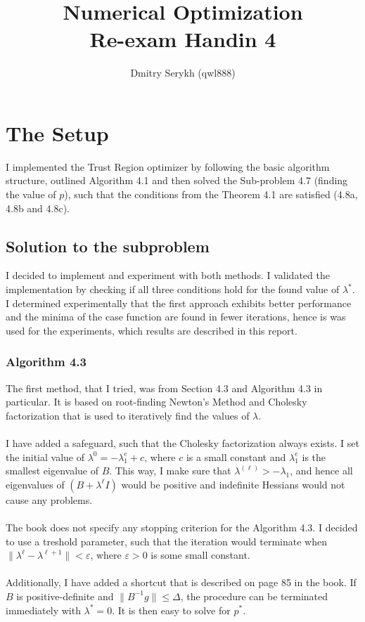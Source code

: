 \documentclass[a4paper]{article}
\title{\vspace{-5cm} Numerical Optimization \\ Re-exam Handin 4}
\author{Dmitry Serykh (qwl888)}
\begin{document}
\maketitle
\section{The Setup}
I implemented the Trust Region optimizer by following the basic algorithm
structure, outlined Algorithm 4.1 and then solved the Sub-problem 4.7 (finding
the value of $p$), such that the conditions from the Theorem 4.1 are satisfied
(4.8a, 4.8b and 4.8c).

\subsection{Solution to the subproblem}
I decided to implement and experiment with both methods. I
validated the implementation by checking if all three conditions hold for the
found value of $\lambda^*$.
I determined experimentally that the first approach exhibits better performance
and the minima of the case function are found in fewer iterations, hence is was
used for the experiments, which results are described in this report.

\subsubsection{Algorithm 4.3}
\label{subsubsec:43}
The first method, that I tried, was from Section 4.3 and
Algorithm 4.3 in particular. It is based on root-finding Newton's Method and Cholesky
factorization that is used to iteratively find the values of $\lambda$.\\\\
I have added a safeguard, such that the Cholesky factorization always exists.
I set the initial value of $\lambda^{0}= -\lambda_1^e + c$, where $c$ is a small
constant and $\lambda_1^e$ is the smallest eigenvalue of $B$. This way, I make
sure that $\lambda^{(\ell)} > -\lambda_{1}$, and hence all eigenvalues of $(B + \lambda^{\ell}I)$
would be positive and indefinite Hessians would not cause any problems.\\\\
The book does not specify any stopping criterion for the Algorithm 4.3. I
decided to use a treshold parameter, such that the iteration would
terminate when  $\| \lambda^{\ell} - \lambda^{\ell + 1} \| < \varepsilon $,
where $\varepsilon > 0$ is some small constant. \\\\
Additionally, I have added a shortcut
that is described on page 85 in the book. If $B$ is positive-definite and $\|
B^{-1}g \| \leq \Delta$, the procedure can be terminated immediately with
$\lambda^*= 0$. It is then easy to solve for $p^*$.
\end{document}
